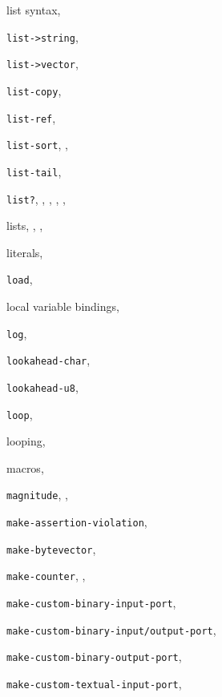 {\begin{multicols}{2}
list syntax, \pageref{grammar_s19}
  
\texttt{list-\textgreater{}string}, \textit{\pageref{objects_s229}}
  
\texttt{list-\textgreater{}vector}, \textit{\pageref{objects_s238}}
  
\texttt{list-copy}, \pageref{start_s140}
  
\texttt{list-ref}, \textit{\pageref{objects_s47}}
  
\texttt{list-sort}, \textit{\pageref{objects_s62}}, \pageref{examples_s9}
  
\texttt{list-tail}, \textit{\pageref{objects_s48}}
  
\texttt{list?}, \pageref{start_s200}, \pageref{further_s39}, \pageref{further_s42}, \pageref{further_s85}, \textit{\pageref{objects_s45}}
  
lists, \pageref{start_s13}, \pageref{start_s20}, \pageref{objects_s28}
  
literals, \pageref{syntax_s15}
  
\texttt{load}, \pageref{start_s0}
  
local variable bindings, \pageref{binding_s17}
  
\texttt{log}, \textit{\pageref{objects_s130}}
  
\texttt{lookahead-char}, \textit{\pageref{io_s62}}
  
\texttt{lookahead-u8}, \textit{\pageref{io_s56}}
  
\texttt{loop}, \pageref{syntax_s46}
  
looping, \pageref{intro_s22}
  
macros, \pageref{syntax_s2}
  
\texttt{magnitude}, \pageref{objects_s106}, \textit{\pageref{objects_s125}}
  
\texttt{make-assertion-violation}, \textit{\pageref{exceptions_s21}}
  
\texttt{make-bytevector}, \textit{\pageref{objects_s242}}
  
\texttt{make-counter}, \pageref{start_s168}, \pageref{start_s187}
  
\texttt{make-custom-binary-input-port}, \textit{\pageref{io_s41}}
  
\texttt{make-custom-binary-input/output-port}, \textit{\pageref{io_s41}}
  
\texttt{make-custom-binary-output-port}, \textit{\pageref{io_s41}}
  
\texttt{make-custom-textual-input-port}, \textit{\pageref{io_s42}}
  

\end{multicols}}
